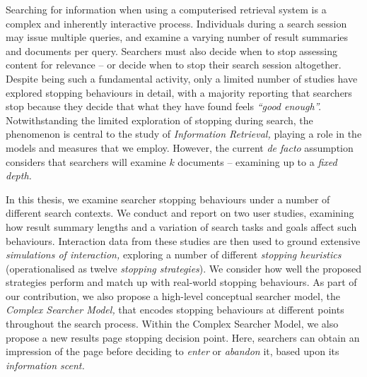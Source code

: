 
\begin{preamble}
{}

Searching for information when using a computerised retrieval system is a complex and inherently interactive process. Individuals during a search session may issue multiple queries, and examine a varying number of result summaries and documents per query. Searchers must also decide when to stop assessing content for relevance -- or decide when to stop their search session altogether. Despite being such a fundamental activity, only a limited number of studies have explored stopping behaviours in detail, with a majority reporting that searchers stop because they decide that what they have found feels \emph{``good enough''.} Notwithstanding the limited exploration of stopping during search, the phenomenon is central to the study of \emph{Information Retrieval,} playing a role in the models and measures that we employ. However, the current \emph{de facto} assumption considers that searchers will examine $k$ documents -- examining up to a \emph{fixed depth.}

In this thesis, we examine searcher stopping behaviours under a number of different search contexts. We conduct and report on two user studies, examining how result summary lengths and a variation of search tasks and goals affect such behaviours. Interaction data from these studies are then used to ground extensive \emph{simulations of interaction,}  exploring a number of different \emph{stopping heuristics} (operationalised as twelve \emph{stopping strategies}). We consider how well the proposed strategies perform and match up with real-world stopping behaviours. As part of our contribution, we also propose a high-level conceptual searcher model, the \emph{Complex Searcher Model,} that encodes stopping behaviours at different points throughout the search process. Within the Complex Searcher Model, we also propose a new results page stopping decision point. Here, searchers can obtain an impression of the page before deciding to \emph{enter} or \emph{abandon} it, based upon its \emph{information scent.}


\end{preamble}
